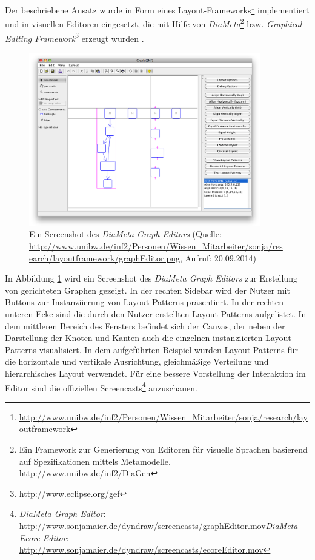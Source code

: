 Der beschriebene Ansatz wurde in Form eines Layout-Frameworks\footnote{\url{http://www.unibw.de/inf2/Personen/Wissen_Mitarbeiter/sonja/research/layoutframework}} implementiert und in visuellen Editoren eingesetzt, die mit Hilfe von \textit{DiaMeta}\footnote{Ein Framework zur Generierung von Editoren für visuelle Sprachen basierend auf Spezifikationen mittels Metamodelle. \url{http://www.unibw.de/inf2/DiaGen}} bzw. \textit{Graphical Editing Framework}\footnote{\url{http://www.eclipse.org/gef}} erzeugt wurden \cite{Maier12A-Pattern-based}.

\begin{figure}[hbt]
    \centering
    \includegraphics[width=0.9\textwidth]{resources/diameta-graph-editor-screenshot}
    \newcommand{\captionvalue}{Ein Screenshot des \textit{DiaMeta Graph Editors}}
    \caption[\captionvalue]{\captionvalue{ }(Quelle: \url{http://www.unibw.de/inf2/Personen/Wissen_Mitarbeiter/sonja/research/layoutframework/graphEditor.png}, Aufruf: 20.09.2014)}
    \label{fig:diameta-graph-editor-screenshot}
\end{figure}

In Abbildung \ref{fig:diameta-graph-editor-screenshot} wird ein Screenshot des \textit{DiaMeta Graph Editors} zur Erstellung von gerichteten Graphen gezeigt. In der rechten Sidebar wird der Nutzer mit Buttons zur Instanziierung von Layout-Patterns präsentiert. In der rechten unteren Ecke sind die durch den Nutzer erstellten Layout-Patterns aufgelistet. In dem mittleren Bereich des Fensters befindet sich der Canvas, der neben der Darstellung der Knoten und Kanten auch die einzelnen instanziierten Layout-Patterns visualisiert. In dem aufgeführten Beispiel wurden Layout-Patterns für die horizontale und vertikale Ausrichtung, gleichmäßige Verteilung und hierarchisches Layout verwendet. Für eine bessere Vorstellung der Interaktion im Editor sind die offiziellen Screencasts\footnote{\textit{DiaMeta Graph Editor}: \url{http://www.sonjamaier.de/dyndraw/screencasts/graphEditor.mov}\newline\textit{DiaMeta Ecore Editor}: \url{http://www.sonjamaier.de/dyndraw/screencasts/ecoreEditor.mov}} anzuschauen.

